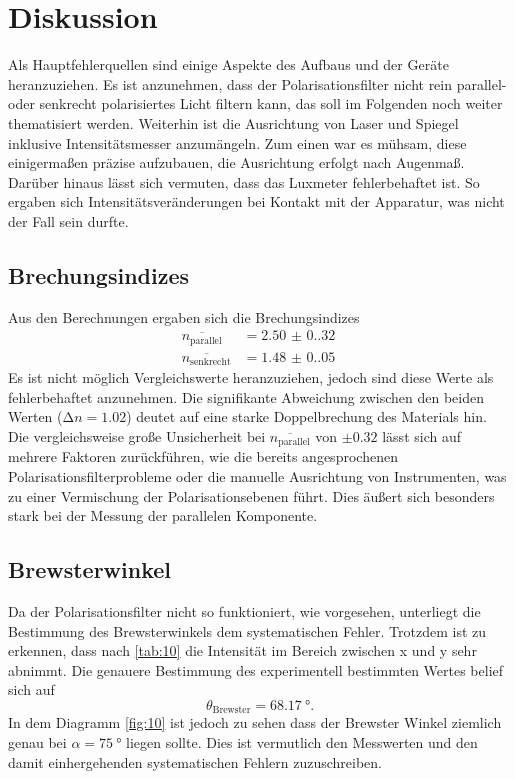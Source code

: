 \section{Diskussion}
\label{sec:Diskussion}

Als Hauptfehlerquellen sind einige Aspekte des Aufbaus und der Geräte heranzuziehen.
Es ist anzunehmen, dass der Polarisationsfilter nicht rein parallel- oder 
senkrecht polarisiertes Licht filtern kann, das soll im Folgenden noch weiter 
thematisiert werden. Weiterhin ist die Ausrichtung von Laser und Spiegel inklusive 
Intensitätsmesser anzumängeln. Zum einen war es mühsam, diese einigermaßen präzise 
aufzubauen, die Ausrichtung erfolgt nach Augenmaß. Darüber hinaus lässt sich 
vermuten, dass das Luxmeter fehlerbehaftet ist. So ergaben sich 
Intensitätsveränderungen bei Kontakt mit der Apparatur, was nicht der Fall sein 
durfte.

\subsection{Brechungsindizes}
Aus den Berechnungen ergaben sich die Brechungsindizes
\begin{align*}
    \overline{n_\text{parallel}}  &= \qty{2.50(0.32)}{} \\
    \overline{n_\text{senkrecht}} &= \qty{1.48(0.05)}{}
\end{align*}
\noindent Es ist nicht möglich Vergleichswerte heranzuziehen, jedoch sind diese 
Werte als fehlerbehaftet anzunehmen. Die signifikante Abweichung zwischen den
beiden Werten ($\increment n = 1.02$) deutet auf eine starke Doppelbrechung des
Materials hin. Die vergleichsweise große Unsicherheit bei $\overline{n_\text{parallel}}$
von $\pm 0.32$ lässt sich auf mehrere Faktoren zurückführen, wie die bereits 
angesprochenen Polarisationsfilterprobleme oder die manuelle Ausrichtung von 
Instrumenten, was zu einer Vermischung der Polarisationsebenen führt.
Dies äußert sich besonders stark bei der Messung der parallelen Komponente.

\subsection{Brewsterwinkel}
Da der Polarisationsfilter nicht so funktioniert, wie vorgesehen, unterliegt die
Bestimmung des Brewsterwinkels dem systematischen Fehler. Trotzdem ist zu erkennen, 
dass nach \autoref{tab:10} die Intensität im Bereich zwischen x und y 
sehr abnimmt. Die genauere Bestimmung des experimentell bestimmten Wertes 
belief sich auf
\begin{equation*}
    \theta_\text{Brewster} = \qty{68.17}{\degree}.
\end{equation*} 
\noindent In dem Diagramm \autoref{fig:10} ist jedoch zu sehen dass der Brewster Winkel ziemlich genau 
bei $\alpha = \qty{75}{\degree}$ liegen sollte. Dies ist vermutlich den Messwerten und den damit einhergehenden systematischen 
Fehlern zuzuschreiben. 


